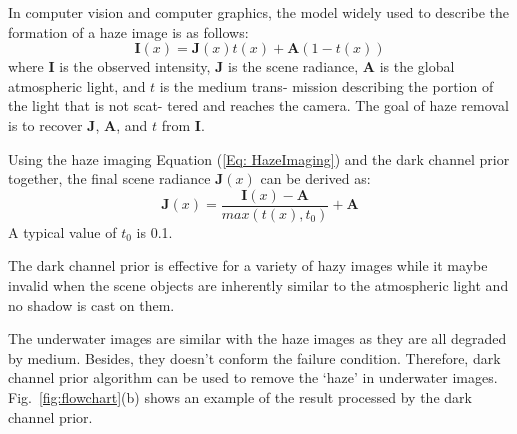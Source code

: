 \documentclass[conference]{IEEEtran}
\begin{document}
In computer vision and computer graphics, the model widely used to describe the formation of a haze image is as follows:
\begin{equation}
\mathbf{I}(x) = \mathbf{J}(x)t(x) + \mathbf{A}(1 - t(x))
\label{Eq: HazeImaging}
\end{equation}
where $\mathbf{I}$ is the observed intensity, $\mathbf{J}$ is the scene radiance, $\mathbf{A}$ is the global atmospheric light, and $t$ is the medium trans- mission describing the portion of the light that is not scat- tered and reaches the camera. The goal of haze removal is to recover $\mathbf{J}$, $\mathbf{A}$, and $t$ from $\mathbf{I}$.

Using the haze imaging Equation (\ref{Eq: HazeImaging}) and the dark channel prior together, the final scene radiance $\mathbf{J}(x)$ can be derived as:
\begin{equation}
\mathbf{J}(x) = \frac{\mathbf{I}(x)-\mathbf{A}}{max(t(x), t_0)} + \mathbf{A}
\end{equation}
A typical value of $t_0$ is 0.1.

The dark channel prior is effective for a variety of hazy images while it maybe invalid when the scene objects are inherently similar to the atmospheric light and no shadow is cast on them.

The underwater images are similar with the haze images as they are all degraded by medium. Besides, they doesn't conform the failure condition. Therefore, dark channel prior algorithm can be used to remove the ‘haze’ in underwater images. Fig.~\ref{fig:flowchart}(b) shows an example of the result processed by the dark channel prior. 
\end{document}
